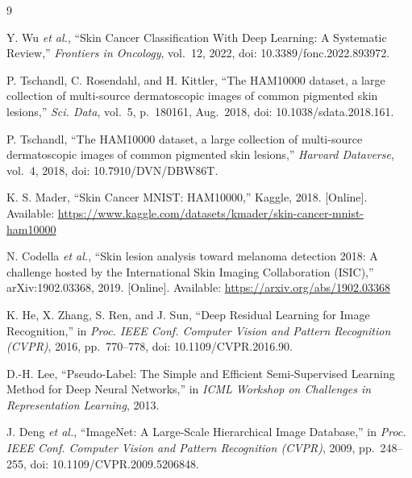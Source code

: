 \documentclass[conference]{IEEEtran}
\begin{document}
\begin{thebibliography}{9}

Y. Wu \textit{et al.}, ``Skin Cancer Classification With Deep
Learning: A Systematic Review,'' \textit{Frontiers in Oncology},
vol.~12, 2022, doi: 10.3389/fonc.2022.893972.

P. Tschandl, C. Rosendahl, and H. Kittler, ``The HAM10000 dataset,
a large collection of multi-source dermatoscopic images of common
pigmented skin lesions,'' \textit{Sci. Data}, vol.~5, p.~180161,
Aug.~2018, doi: 10.1038/sdata.2018.161.

P. Tschandl, ``The HAM10000 dataset, a large collection of
multi-source dermatoscopic images of common pigmented skin
lesions,'' \textit{Harvard Dataverse}, vol.~4, 2018,
doi: 10.7910/DVN/DBW86T.

K. S. Mader, ``Skin Cancer MNIST: HAM10000,'' Kaggle, 2018.
[Online]. Available:
\url{https://www.kaggle.com/datasets/kmader/skin-cancer-mnist-ham10000}

N. Codella \textit{et al.}, ``Skin lesion analysis toward melanoma
detection 2018: A challenge hosted by the International Skin Imaging
Collaboration (ISIC),'' arXiv:1902.03368, 2019. [Online]. Available:
\url{https://arxiv.org/abs/1902.03368}

K. He, X. Zhang, S. Ren, and J. Sun, ``Deep Residual Learning for
Image Recognition,'' in \textit{Proc. IEEE Conf. Computer Vision
and Pattern Recognition (CVPR)}, 2016, pp.~770--778,
doi: 10.1109/CVPR.2016.90.

D.-H. Lee, ``Pseudo-Label: The Simple and Efficient Semi-Supervised
Learning Method for Deep Neural Networks,'' in \textit{ICML
Workshop on Challenges in Representation Learning}, 2013.

J. Deng \textit{et al.}, ``ImageNet: A Large-Scale Hierarchical
Image Database,'' in \textit{Proc. IEEE Conf. Computer Vision and
Pattern Recognition (CVPR)}, 2009, pp.~248--255,
doi: 10.1109/CVPR.2009.5206848.

\end{thebibliography}
\end{document}
